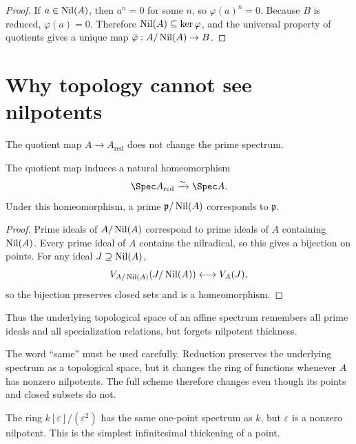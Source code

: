 \begin{proof}
If $a\in\operatorname{Nil}(A)$, then $a^n=0$ for some $n$, so $\varphi(a)^n=0$.  Because $B$ is
reduced, $\varphi(a)=0$.  Therefore $\operatorname{Nil}(A)\subseteq\ker\varphi$, and the universal
property of quotients gives a unique map $\bar\varphi:A/\operatorname{Nil}(A)\to B$.
\end{proof}



\section{Why topology cannot see nilpotents}

The quotient map $A\to A_{\mathrm{red}}$ does not change the prime spectrum.

\begin{theorem}
The quotient map induces a natural homeomorphism
\[
\Spec A_{\mathrm{red}}\xrightarrow{\sim}\Spec A.
\]
Under this homeomorphism, a prime $\mathfrak p/\operatorname{Nil}(A)$ corresponds to
$\mathfrak p$.
\end{theorem}

\begin{proof}
Prime ideals of $A/\operatorname{Nil}(A)$ correspond to prime ideals of $A$ containing $\operatorname{Nil}(A)$.
Every prime ideal of $A$ contains the nilradical, so this gives a bijection on points.
For any ideal $J\supseteq\operatorname{Nil}(A)$,
\[
V_{A/\operatorname{Nil}(A)}(J/\operatorname{Nil}(A))
\longleftrightarrow
V_A(J),
\]
so the bijection preserves closed sets and is a homeomorphism.
\end{proof}

Thus the underlying topological space of an affine spectrum remembers all prime ideals and
all specialization relations, but forgets nilpotent thickness.



\begin{remark}
The word ``same'' must be used carefully.  Reduction preserves the underlying spectrum as a
topological space, but it changes the ring of functions whenever $A$ has nonzero
nilpotents.  The full scheme therefore changes even though its points and closed subsets do
not.
\end{remark}

\begin{example}\label{ex:vi10-expand-01}
The ring $k[\varepsilon]/(\varepsilon^2)$ has the same one-point spectrum as $k$, but $\varepsilon$ is a nonzero nilpotent.  This is the simplest infinitesimal thickening of a point.
\end{example}
